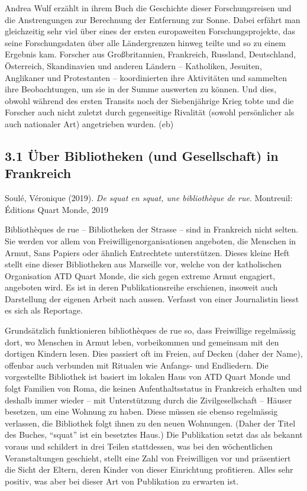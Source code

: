 \documentclass[a4paper,
fontsize=11pt,
oneside,
numbers=noperiodatend,
parskip=half-,
bibliography=totoc,
final
]{scrartcl}
\begin{document}
Andrea Wulf erzählt in ihrem Buch die Geschichte dieser Forschungsreisen
und die Anstrengungen zur Berechnung der Entfernung zur Sonne. Dabei
erfährt man gleichzeitig sehr viel über eines der ersten europaweiten
Forschungsprojekte, das seine Forschungsdaten über alle Ländergrenzen
hinweg teilte und so zu einem Ergebnis kam. Forscher aus Großbritannien,
Frankreich, Russland, Deutschland, Österreich, Skandinavien und anderen
Ländern -- Katholiken, Jesuiten, Anglikaner und Protestanten --
koordinierten ihre Aktivitäten und sammelten ihre Beobachtungen, um sie
in der Summe auswerten zu können. Und dies, obwohl während des ersten
Transits noch der Siebenjährige Krieg tobte und die Forscher auch nicht
zuletzt durch gegenseitige Rivalität (sowohl persönlicher als auch
nationaler Art) angetrieben wurden. (eb)

\hypertarget{uxfcber-bibliotheken-und-gesellschaft-in-frankreich}{%
\subsection{3.1 Über Bibliotheken (und Gesellschaft) in
Frankreich}\label{uxfcber-bibliotheken-und-gesellschaft-in-frankreich}}

Soulé, Véronique (2019). \emph{De squat en squat, une bibliothèque de
rue}. Montreuil: Éditions Quart Monde, 2019

Bibliothèques de rue -- Bibliotheken der Strasse -- sind in Frankreich
nicht selten. Sie werden vor allem von Freiwilligenorganisationen
angeboten, die Menschen in Armut, Sans Papiers oder ähnlich Entrechtete
unterstützen. Dieses kleine Heft stellt eine dieser Bibliotheken aus
Marseille vor, welche von der katholischen Organisation ATD Quart Monde,
die sich gegen extreme Armut engagiert, angeboten wird. Es ist in deren
Publikationsreihe erschienen, insoweit auch Darstellung der eigenen
Arbeit nach aussen. Verfasst von einer Journalistin liesst es sich als
Reportage.

Grundsätzlich funktionieren bibliothèques de rue so, dass Freiwillige
regelmässig dort, wo Menschen in Armut leben, vorbeikommen und gemeinsam
mit den dortigen Kindern lesen. Dies passiert oft im Freien, auf Decken
(daher der Name), offenbar auch verbunden mit Ritualen wie Anfangs- und
Endliedern. Die vorgestellte Bibliothek ist basiert im lokalen Haus von
ATD Quart Monde und folgt Familien von Roma, die keinen
Aufenthaltsstatus in Frankreich erhalten und deshalb immer wieder -- mit
Unterstützung durch die Zivilgesellschaft -- Häuser besetzen, um eine
Wohnung zu haben. Diese müssen sie ebenso regelmässig verlassen, die
Bibliothek folgt ihnen zu den neuen Wohnungen. (Daher der Titel des
Buches, \enquote{squat} ist ein besetztes Haus.) Die Publikation setzt
das als bekannt voraus und schildert in drei Teilen stattdessen, was bei
den wöchentlichen Veranstaltungen geschieht, stellt eine Zahl von
Freiwilligen vor und präsentiert die Sicht der Eltern, deren Kinder von
dieser Einrichtung profitieren. Alles sehr positiv, was aber bei dieser
Art von Publikation zu erwarten ist.
\end{document}
